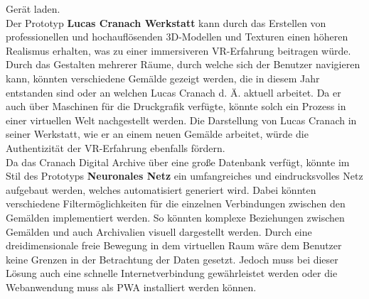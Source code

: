 \documentclass[a4paper,12pt,oneside]{article}
\begin{document}
    Gerät laden. \\
    Der Prototyp \textbf{Lucas Cranach Werkstatt} kann durch das Erstellen
    von professionellen und hochauflösenden 3D-Modellen und Texturen
    einen höheren Realismus erhalten, was zu einer immersiveren
    VR-Erfahrung beitragen würde. Durch das Gestalten mehrerer Räume,
    durch welche sich der Benutzer navigieren kann, könnten verschiedene
    Gemälde gezeigt werden, die in diesem Jahr entstanden sind oder an
    welchen Lucas Cranach d. Ä. aktuell arbeitet. Da er auch über
    Maschinen für die Druckgrafik verfügte, könnte solch ein Prozess
    in einer virtuellen Welt nachgestellt werden. 
    Die Darstellung von Lucas Cranach in seiner Werkstatt, wie er an
    einem neuen Gemälde arbeitet, würde die Authentizität der VR-Erfahrung
    ebenfalls fördern. \\
    Da das Cranach Digital Archive über eine große Datenbank verfügt,
    könnte im Stil des Prototyps \textbf{Neuronales Netz} ein 
    umfangreiches und eindrucksvolles Netz aufgebaut werden, welches
    automatisiert generiert wird. Dabei könnten verschiedene 
    Filtermöglichkeiten für die einzelnen Verbindungen zwischen den 
    Gemälden implementiert werden. So könnten komplexe Beziehungen
    zwischen Gemälden und auch Archivalien visuell dargestellt werden.
    Durch eine dreidimensionale freie Bewegung in dem virtuellen Raum 
    wäre dem Benutzer keine Grenzen in der Betrachtung der Daten gesetzt.
    Jedoch muss bei dieser Lösung auch eine schnelle Internetverbindung
    gewährleistet werden oder die Webanwendung muss als PWA installiert
    werden können.
\end{document}
